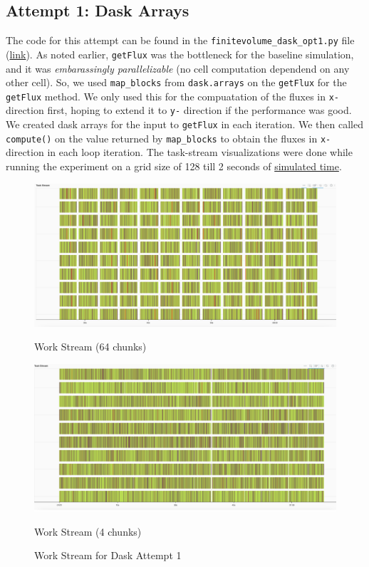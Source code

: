 \documentclass[a4paper,10pt]{article}
\begin{document}
\subsection{Attempt 1: Dask Arrays}
The code for this attempt can be found in the \verb|finitevolume_dask_opt1.py| file (\href{https://github.com/paulmyr/DD2358-HPC25/blob/master/10_project_rishi_paul/code/dask/finitevolume_dask_opt1.py}{link}).
As noted earlier, \verb|getFlux| was the bottleneck for the baseline simulation, and it was \textit{embarassingly parallelizable} (no cell computation dependend on any other cell).
So, we used \verb|map_blocks| from \verb|dask.arrays| on the \verb|getFlux| for the \verb|getFlux| method.
We only used this for the compuatation of the fluxes in \verb|x-| direction first, hoping to extend it to \verb|y-| direction if the performance was good.
We created dask arrays for the input to \verb|getFlux| in each iteration.
We then called \verb|compute()| on the value returned by \verb|map_blocks| to obtain the fluxes in \verb|x-| direction in each loop iteration.
The task-stream visualizations were done while running the experiment on a grid size of 128 till 2 seconds of \underline{simulated time}.
\begin{figure}[h!]
   \begin{minipage}{0.5\textwidth}
       \centering
       \includegraphics[width=\linewidth]{images/dask/dask_opt1_n_by_8.png}
      \caption{Work Stream (64 chunks)}
       \label{fig:dask_opt1_stream_64}
   \end{minipage}
   \hspace{0.1cm}
   \begin{minipage}{0.5\textwidth}
       \centering
       \includegraphics[width=\linewidth]{images/dask/dask_opt1_n_by_2.png}
      \caption{Work Stream (4 chunks)}
      \label{fig:dask_opt1_stream_4}
  \end{minipage}
  \caption{Work Stream for Dask Attempt 1}
  \label{fig:dask_opt1_stream}
\end{figure}
\end{document}
